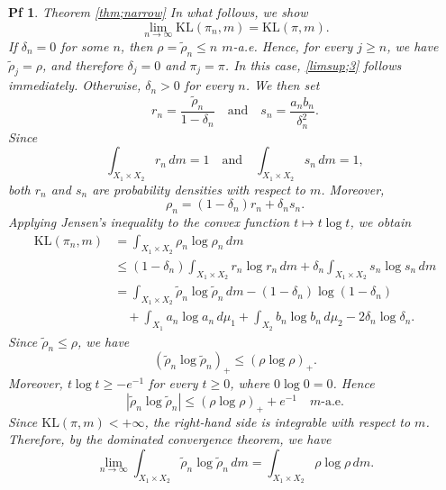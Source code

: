 \documentclass[10pt,a4paper]{amsart}
\newtheorem{pf}{Pf}
\newcommand{\dl}{\delta}
\begin{document}
\begin{pf}{Theorem \ref{thm;narrow}}
In what follows, we show 
\begin{equation}\label{limsup;3}
\lim_{n\to\infty}\mathrm{KL}(\pi_n,m)=\mathrm{KL}(\pi,m).
\end{equation}
If $\dl_n=0$ for some $n$, then $\rho=\tilde{\rho}_n\leq n$ $m$-a.e. Hence, for every $j\geq n$, we have $\tilde{\rho}_j=\rho$, and therefore $\dl_j=0$ and $\pi_j=\pi$. In this case, \eqref{limsup;3} follows immediately. Otherwise, $\dl_n>0$ for every $n$. We then set
\begin{equation*}
r_n = \frac{\tilde{\rho}_n}{1-\dl_n} \quad\mathrm{and}\quad s_n = \frac{a_nb_n}{\dl_n^2}.
\end{equation*}
Since
\begin{equation*}
\int_{X_1\times X_2}r_n\,dm = 1 \quad\mathrm{and}\quad \int_{X_1\times X_2}s_n\,dm = 1,
\end{equation*}
both $r_n$ and $s_n$ are probability densities with respect to $m$. Moreover,
\begin{equation*}
\rho_n = (1-\dl_n)r_n + \dl_n s_n.
\end{equation*}
Applying Jensen's inequality to the convex function $t\mapsto t\log t$, we obtain
\begin{align*}
\mathrm{KL}(\pi_n,m)
&=\int_{X_1\times X_2}\rho_n\log\rho_n\,dm \\
&\leq (1-\dl_n)\int_{X_1\times X_2}r_n\log r_n\,dm
+\dl_n\int_{X_1\times X_2}s_n\log s_n\,dm \\
&=\int_{X_1\times X_2}\tilde{\rho}_n\log\tilde{\rho}_n\,dm
-(1-\dl_n)\log(1-\dl_n) \\
&\quad +\int_{X_1}a_n\log a_n\,d\mu_1
+\int_{X_2}b_n\log b_n\,d\mu_2
-2\dl_n\log\dl_n.
\end{align*}
Since $\tilde{\rho}_n\leq\rho$, we have
\begin{equation*}
(\tilde{\rho}_n\log\tilde{\rho}_n)_+ \leq (\rho\log\rho)_+.
\end{equation*}
Moreover, $t\log t\geq-e^{-1}$ for every $t\geq0$, where $0\log0=0$. Hence
\begin{equation*}
\left|\tilde{\rho}_n\log\tilde{\rho}_n\right| \leq (\rho\log\rho)_+ + e^{-1} \quad m\text{-a.e.}
\end{equation*}
Since $\mathrm{KL}(\pi,m)<+\infty$, the right-hand side is integrable with respect to $m$. Therefore, by the dominated convergence theorem, we have
\begin{equation*}
\lim_{n\to\infty}\int_{X_1\times X_2}\tilde{\rho}_n\log\tilde{\rho}_n\,dm = \int_{X_1\times X_2}\rho\log\rho\,dm.
\end{equation*}

\end{pf}
\end{document}
